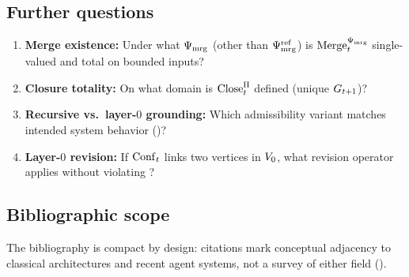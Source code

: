 \subsection{Further questions}
\label{app:open-questions}
\begin{enumerate}[leftmargin=*]
  \item \textbf{Merge existence:} Under what $\Psi_{\mathrm{mrg}}$ (other than $\Psi_{\mathrm{mrg}}^{\mathrm{ref}}$) is $\mathrm{Merge}_t^{\Psi_{\mathrm{mrg}}}$ single-valued and total on bounded inputs?
  \item \textbf{Closure totality:} On what domain is $\mathrm{Close}_t^{\Pi}$ defined (unique $G_{t+1}$)?
  \item \textbf{Recursive vs.\ layer-$0$ grounding:} Which admissibility variant matches intended system behavior ()?
  \item \textbf{Layer-$0$ revision:} If $\mathrm{Conf}_t$ links two vertices in $V_{0}$, what revision operator applies without violating ?
\end{enumerate}

\subsection{Bibliographic scope}
\label{app:bib-scope}
The bibliography is compact by design: citations mark conceptual adjacency to classical architectures and recent agent systems, not a survey of either field ().
